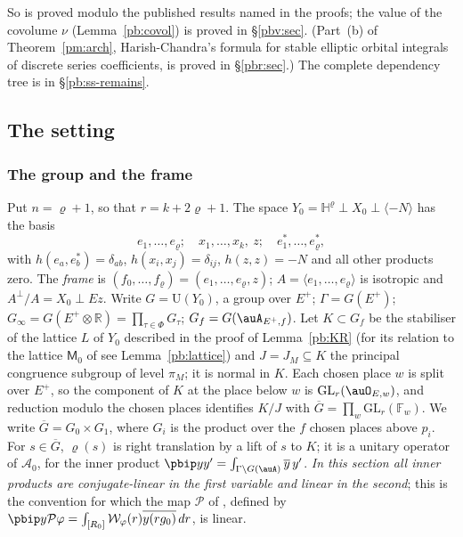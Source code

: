 \documentclass[10pt]{amsart}
\theoremstyle{definition}
\theoremstyle{remark}
\newcommand{\R}{\mathbb R}
\providecommand{\auAz}{\mathcal A_0}
\providecommand{\auF}{\mathbb F}
\providecommand{\auG}{\overline G}
\providecommand{\auGL}{\mathrm{GL}}
\providecommand{\auP}{\mathcal P}
\providecommand{\auPl}{\Phi}
\providecommand{\auU}{\mathrm U}
\providecommand{\aubar}[1]{\overline{#1}}
\begin{document}
So {\cite[Theorem~14.14]{P46}} is proved modulo the published results named in the proofs; the value of the
covolume $\nu$ (Lemma~\ref{pb:covol}) is proved in \S\ref{pbv:sec}. (Part~(b) of Theorem~\ref{pm:arch}, Harish-Chandra's formula for stable
elliptic orbital integrals of discrete series coefficients, is proved in \S\ref{pbr:sec}.) The complete dependency tree is in \S\ref{pb:ss-remains}.

\subsection{The setting}\label{pb:ss-setting}

\subsubsection*{The group and the frame}
Put $n=\varrho+1$, so that $r=k+2\varrho+1$. The space $Y_0=\mathbb H^{\varrho}\perp X_0\perp
\langle-N\rangle$ has the basis
\[
e_1,\dots,e_\varrho;\quad x_1,\dots,x_k,\ z;\quad e_1^*,\dots,e_\varrho^*,
\]
with $h(e_a,e_b^*)=\delta_{ab}$, $h(x_i,x_j)=\delta_{ij}$, $h(z,z)=-N$ and all other products
zero. The \emph{frame} is $(f_0,\dots,f_\varrho)=(e_1,\dots,e_\varrho,z)$; $A=\langle e_1,\dots,
e_\varrho\rangle$ is isotropic and $A^\perp/A=X_0\perp Ez$. Write $G=\auU(Y_0)$, a group over
$E^+$; $\Gamma=G(E^+)$; $G_\infty=G(E^+\otimes\R)=\prod_{\tau\in\auPl}G_\tau$;
$G_f=G(\auA_{E^+,f})$. Let $K\subset G_f$ be the stabiliser of the lattice $L$ of $Y_0$ described in the proof of
Lemma~\ref{pb:KR} (for its relation to the lattice $\mathsf M_0$ of {\cite[(35)]{P49}} see
Lemma~\ref{pb:lattice}) and $J=J_M
\subseteq K$ the principal congruence subgroup of level $\pi_M$; it is normal in $K$. Each chosen
place $w$ is split over $E^+$, so the component of $K$ at the place below $w$ is
$\auGL_r(\auO_{E,w})$, and reduction modulo the chosen places identifies $K/J$ with
$\auG=\prod_w\auGL_r(\auF_w)$. We write $\auG=G_0\times G_1$, where $G_i$ is the product over the
$f$ chosen places above $p_i$. For $s\in\auG$, $\varrho(s)$ is right translation by a lift of $s$
to $K$; it is a unitary operator of $\auAz$, for the inner product $\pbip y{y'}=\int_{\Gamma
\backslash G(\auA)}\aubar y\,y'$. \emph{In this section all inner products are conjugate-linear in
the first variable and linear in the second}; this is the convention for which the map $\auP$ of
{\cite[\S14.3]{P46}}, defined by $\pbip y{\auP\varphi}=\int_{[R_0]}\mathcal W_\varphi(r)\aubar{y(rg_0)}
\,dr$, is linear.
\end{document}
